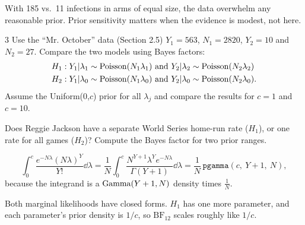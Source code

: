 \documentclass[11pt]{article}
\begin{document}
\begin{takeaway}
With 185 vs.\ 11 infections in arms of equal size, the data overwhelm any reasonable prior. Prior sensitivity matters when the evidence is modest, not here.
\end{takeaway}


\begin{problem}{3}
Use the ``Mr. October'' data (Section 2.5) $Y_1=563$, $N_1=2820$, $Y_2=10$ and $N_2=27$. Compare the two models using Bayes factors:
\begin{align*}
H_1&: Y_1|\lambda_1\sim\dist{Poisson}(N_1\lambda_1)\ \text{and}\ Y_2|\lambda_2\sim\dist{Poisson}(N_2\lambda_2)\\
H_2&: Y_1|\lambda_0\sim\dist{Poisson}(N_1\lambda_0)\ \text{and}\ Y_2|\lambda_0\sim\dist{Poisson}(N_2\lambda_0).
\end{align*}
Assume the Uniform(0,$c$) prior for all $\lambda_j$ and compare the results for $c=1$ and $c=10$.
\end{problem}

\begin{restate}
Does Reggie Jackson have a separate World Series home-run rate ($H_1$), or one rate for all games ($H_2$)? Compute the Bayes factor for two prior ranges.
\end{restate}

\begin{recall}
\[
\int_0^c\frac{e^{-N\lambda}(N\lambda)^Y}{Y!}\dd\lambda=\frac{1}{N}\int_0^c\frac{N^{Y+1}\lambda^Ye^{-N\lambda}}{\Gamma(Y+1)}\dd\lambda=\frac{1}{N}\,\texttt{pgamma}(c,\ Y+1,\ N),
\]
because the integrand is a $\mathrm{Gamma}(Y+1,N)$ density times $\frac1N$.
\end{recall}

\begin{keyidea}
Both marginal likelihoods have closed forms. $H_1$ has one more parameter, and each parameter's prior density is $1/c$, so $\text{BF}_{12}$ scales roughly like $1/c$.
\end{keyidea}
\end{document}
